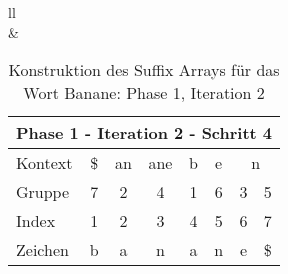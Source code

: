 \begin{table}[H]
\begin{adjustbox}{max width=\textwidth}
\begin{tabular}{ll}
\\
&
\\

\begin{tabular}{lccccccc}
\multicolumn{8}{l}{Phase 1 - Iteration 2 - Schritt 4}                                                                                                                                                                                  \\ \hline
\multicolumn{1}{l|}{Kontext} & \multicolumn{1}{c|}{\$} & \multicolumn{1}{c|}{\cellcolor[HTML]{\yellow}an} & \multicolumn{1}{c|}{\cellcolor[HTML]{\yellow}ane} & \multicolumn{1}{c|}{b} & \multicolumn{1}{c|}{e} & \multicolumn{2}{c}{n} \\
\multicolumn{1}{l|}{Gruppe}  & \multicolumn{1}{c|}{7}  & \multicolumn{1}{c|}{\cellcolor[HTML]{\yellow}2}  & \multicolumn{1}{c|}{\cellcolor[HTML]{\yellow}4}   & \multicolumn{1}{c|}{1} & \multicolumn{1}{c|}{6} & 3         & 5          \\ \hline
\multicolumn{1}{l|}{Index}   & 1                       & 2                                               & 3                                                & 4                      & 5                      & 6         & 7          \\
\multicolumn{1}{l|}{Zeichen} & b                       & a                                               & n                                                & a                      & n                      & e         & \$        
\end{tabular}

\end{tabular}
\end{adjustbox}

\caption[Konstruktion des Suffix Arrays f{\"u}r das Wort Banane: Phase 1, Iteration 2]{Konstruktion des Suffix Arrays f{\"u}r das Wort Banane: Phase 1, Iteration 2}
\label{gsaca:fig_banane_1_2} 
\end{table}
